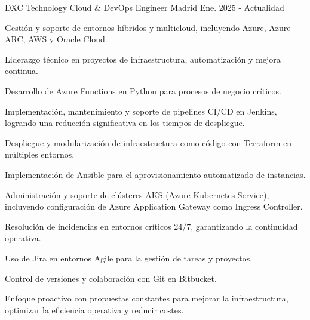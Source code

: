

\begin{cventries}

  \cventry
    {DXC Technology} %
    {Cloud \& DevOps Engineer} %
    {Madrid} %
    {Ene. 2025 - Actualidad} %
    {
      \begin{cvitems} %
        \item {Gestión y soporte de entornos híbridos y multicloud, incluyendo Azure, Azure ARC, AWS y Oracle Cloud.}
        \item {Liderazgo técnico en proyectos de infraestructura, automatización y mejora continua.}
        \item {Desarrollo de Azure Functions en Python para procesos de negocio críticos.}
        \item {Implementación, mantenimiento y soporte de pipelines CI/CD en Jenkins, logrando una reducción significativa en los tiempos de despliegue.}
        \item {Despliegue y modularización de infraestructura como código con Terraform en múltiples entornos.}
        \item {Implementación de Ansible para el aprovisionamiento automatizado de instancias.}
        \item {Administración y soporte de clústeres AKS (Azure Kubernetes Service), incluyendo configuración de Azure Application Gateway como Ingress Controller.}
        \item {Resolución de incidencias en entornos críticos 24/7, garantizando la continuidad operativa.}
        \item {Uso de Jira en entornos Agile para la gestión de tareas y proyectos.}
        \item {Control de versiones y colaboración con Git en Bitbucket.}
        \item {Enfoque proactivo con propuestas constantes para mejorar la infraestructura, optimizar la eficiencia operativa y reducir costes.}
      \end{cvitems}
    }


\end{cventries}
